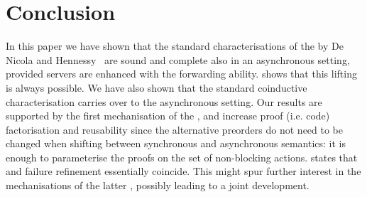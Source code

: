 \section{Conclusion}
\label{sec:conclusion}
\label{sec:discussion}

In this paper we have shown that the standard characterisations of
  the \mustpreorder by De Nicola and
  Hennessy~\cite{DBLP:journals/tcs/NicolaH84,DBLP:books/daglib/0066919}
  are sound and complete also in an asynchronous setting, provided servers are
  enhanced with the forwarding ability.
   shows that this lifting is always possible.
  We have also shown that the standard coinductive characterisation carries over to the
  asynchronous setting.
  Our results %
  are supported by %
  the first mechanisation of the \mustpreorder, and increase proof
  (i.e. code) factorisation and reusability since the alternative preorders
  do not need to be changed when shifting between synchronous and
  asynchronous semantics: it is enough to parameterise the proofs on
  the set of non-blocking actions.
%
%
%
   states that \mustpreorder and failure
  refinement essentially coincide. This might spur further interest in
  the mechanisations of the latter
  \cite{HOL-CSP-AFP,DBLP:journals/acta/BaxterRC22}, possibly leading
  to a joint development.%


